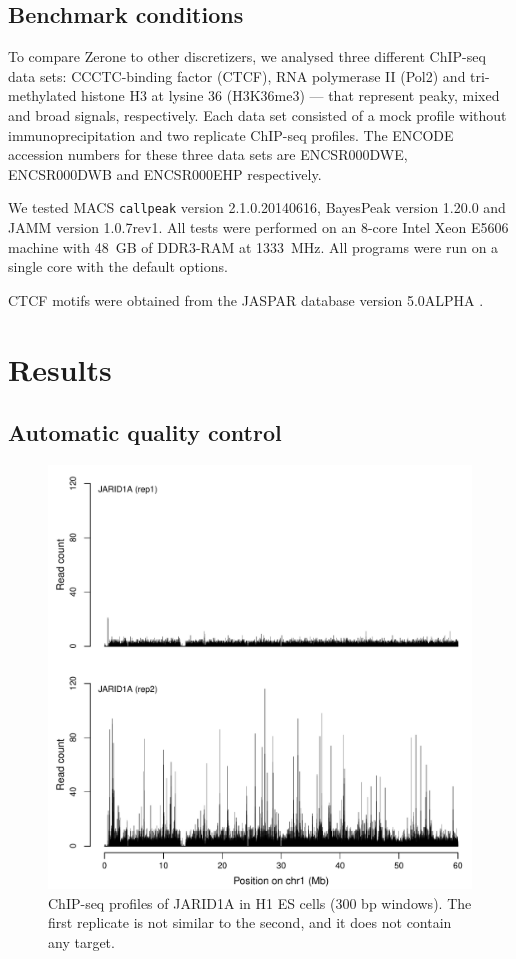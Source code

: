 \documentclass{bioinfo}
\begin{document}
\begin{methods}
\subsection{Benchmark conditions}
To compare Zerone to other discretizers, we analysed three different
ChIP-seq data sets: CCCTC-binding factor (CTCF), RNA polymerase II
(Pol2) and tri-methylated histone H3 at lysine 36 (H3K36me3) --- that
represent peaky, mixed and broad signals, respectively. Each
data set consisted of a mock profile without immunoprecipitation
and two replicate ChIP-seq profiles.
The ENCODE accession numbers for these three data sets are
ENCSR000DWE, ENCSR000DWB and ENCSR000EHP respectively.

We tested MACS \texttt{callpeak} version 2.1.0.20140616, BayesPeak
version 1.20.0 and JAMM version 1.0.7rev1. All tests were performed on
an 8-core Intel Xeon E5606 machine with 48~GB of DDR3-RAM at 1333~MHz.
All programs were run on a single core with the default options.

CTCF motifs were obtained from the JASPAR database version
5.0{\textunderscore}ALPHA \citep{pmid24194598}.

\end{methods}

\section{Results}
\label{sec:results}

\subsection{Automatic quality control}

\begin{figure}[!tpb]
\centerline{\includegraphics[scale=0.5]{jarid.pdf}}
\caption{
  ChIP-seq profiles of JARID1A in H1 ES cells (300 bp windows).
  The first replicate is not similar to the second, and it does not
  contain any target.
}\label{fig:jarid}
\end{figure}
\end{document}
